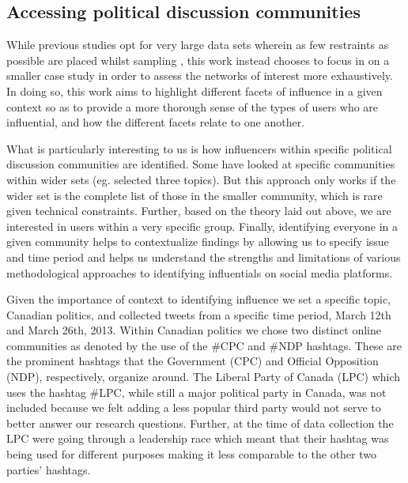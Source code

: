 \documentclass[a4paper,12pt]{article}
\begin{document}
\subsection{Accessing political discussion communities}

While previous studies opt for very large data sets wherein as few restraints as possible are placed whilst sampling \cite{Bakshy, Cha, Ye2010}, this work instead chooses to focus in on a smaller case study in order to assess the networks of interest more exhaustively. In doing so, this work aims to highlight different facets of influence in a given context so as to provide a more thorough sense of the types of users who are influential, and how the different facets relate to one another.

What is particularly interesting to us is how influencers within specific political discussion communities are identified. Some have looked at specific communities within wider sets (eg. \cite{Cha} selected three topics). But this approach only works if the wider set is the complete list of those in the smaller community, which is rare given technical constraints. Further, based on the theory laid out above, we are interested in users within a very specific group. Finally, identifying everyone in a given community helps to contextualize findings by allowing us to specify issue and time period and helps us understand the strengths and limitations of various methodological approaches to identifying influentials on social media platforms.

Given the importance of context to identifying influence we set a specific topic, Canadian politics, and collected tweets from a specific time period, March 12th and March 26th, 2013. Within Canadian politics we chose two distinct online communities as denoted by the use of the \#CPC and \#NDP hashtags. These are the prominent hashtags that the Government (CPC) and Official Opposition (NDP), respectively, organize around. The Liberal Party of Canada (LPC) which uses the hashtag \#LPC, while still a major political party in Canada, was not included because we felt adding a less popular third party would not serve to better answer our research questions. Further, at the time of data collection the LPC were going through a leadership race which meant that their hashtag was being used for different purposes making it less comparable to the other two parties' hashtags.
\end{document}
